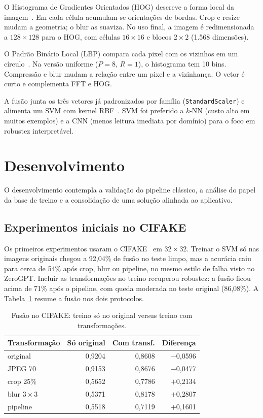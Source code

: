 \documentclass[12pt]{article}
\begin{document}
O Histograma de Gradientes Orientados (HOG) descreve a forma local da imagem~\cite{dalal2005hog}. Em cada célula acumulam-se orientações de bordas. Crop e resize mudam a geometria; o blur as suaviza. No uso final, a imagem é redimensionada a $128{\times}128$ para o HOG, com células $16{\times}16$ e blocos $2{\times}2$ (1{.}568 dimensões).

O Padrão Binário Local (LBP) compara cada pixel com os vizinhos em um círculo~\cite{ojala2002lbp}. Na versão uniforme ($P{=}8$, $R{=}1$), o histograma tem 10 bins. Compressão e blur mudam a relação entre um pixel e a vizinhança. O vetor é curto e complementa FFT e HOG.

A fusão junta os três vetores já padronizados por família (\texttt{StandardScaler}) e alimenta um SVM com kernel RBF~\cite{cortes1995svm}. SVM foi preferido a $k$-NN (custo alto em muitos exemplos) e a CNN (menos leitura imediata por domínio) para o foco em robustez interpretável.

\section{Desenvolvimento}
\label{sec:desenvolvimento}

O desenvolvimento contempla a validação do pipeline clássico, a análise do papel da base de treino e a consolidação de uma solução alinhada ao aplicativo.

\subsection{Experimentos iniciais no CIFAKE}

Os primeiros experimentos usaram o CIFAKE~\cite{bird2024cifake} em $32{\times}32$. Treinar o SVM só nas imagens originais chegou a 92,04\% de fusão no teste limpo, mas a acurácia caiu para cerca de 54\% após crop, blur ou pipeline, no mesmo estilo de falha visto no ZeroGPT. Incluir as transformações no treino recuperou robustez: a fusão ficou acima de 71\% após o pipeline, com queda moderada no teste original (86,08\%). A Tabela~\ref{tab:cifake} resume a fusão nos dois protocolos.

\begin{table}[ht]
\centering
\small
\caption{Fusão no CIFAKE: treino só no original versus treino com transformações.}
\label{tab:cifake}
\begin{tabular}{lrrr}
\toprule
Transformação & Só original & Com transf. & Diferença \\
\midrule
original     & 0,9204 & 0,8608 & $-$0,0596 \\
JPEG 70      & 0,9153 & 0,8676 & $-$0,0477 \\
crop 25\%    & 0,5652 & 0,7786 & $+$0,2134 \\
blur $3{\times}3$ & 0,5371 & 0,8178 & $+$0,2807 \\
pipeline     & 0,5518 & 0,7119 & $+$0,1601 \\
\bottomrule
\end{tabular}
\end{table}
\end{document}
